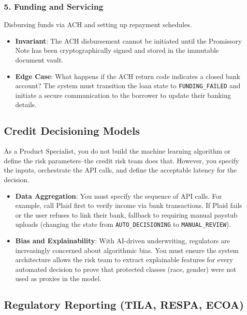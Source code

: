 \documentclass[
  11pt,
  openany,
  oneside]{book}
\providecommand{\tightlist}{%
  \setlength{\itemsep}{0pt}\setlength{\parskip}{0pt}}
\begin{document}
\subsubsection{5. Funding and Servicing}\label{funding-and-servicing}

Disbursing funds via ACH and setting up repayment schedules.

\begin{itemize}
\tightlist
\item
  \textbf{Invariant}: The ACH disbursement cannot be initiated until the
  Promissory Note has been cryptographically signed and stored in the
  immutable document vault.
\item
  \textbf{Edge Case}: What happens if the ACH return code indicates a
  closed bank account? The system must transition the loan state to
  \texttt{FUNDING\_FAILED} and initiate a secure communication to the
  borrower to update their banking details.
\end{itemize}

\subsection{Credit Decisioning Models}\label{credit-decisioning-models}

As a Product Specialist, you do not build the machine learning algorithm
or define the risk parameters--the credit risk team does that. However,
you specify the inputs, orchestrate the API calls, and define the
acceptable latency for the decision.

\begin{itemize}
\tightlist
\item
  \textbf{Data Aggregation}: You must specify the sequence of API calls.
  For example, call Plaid first to verify income via bank transactions.
  If Plaid fails or the user refuses to link their bank, fallback to
  requiring manual paystub uploads (changing the state from
  \texttt{AUTO\_DECISIONING} to \texttt{MANUAL\_REVIEW}).
\item
  \textbf{Bias and Explainability}: With AI-driven underwriting,
  regulators are increasingly concerned about algorithmic bias. You must
  ensure the system architecture allows the risk team to extract
  explainable features for every automated decision to prove that
  protected classes (race, gender) were not used as proxies in the
  model.
\end{itemize}

\subsection{Regulatory Reporting (TILA, RESPA,
ECOA)}\label{regulatory-reporting-tila-respa-ecoa}
\end{document}
